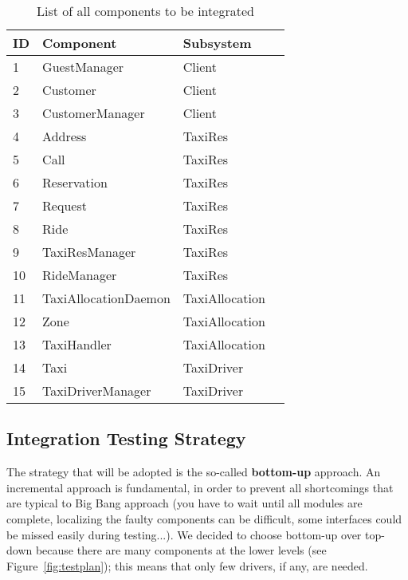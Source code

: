 \documentclass[a4paper, 11pt]{article}
\newcounter{tc}
\begin{document}
\begin{table}
    \centering
    \begin{tabular}{| l | l | p{} | p{} |}
    \hline
    \textbf{ID} & \textbf{Component} & \textbf{Subsystem} \\
    \hline
    1 & GuestManager & Client\\
    \hline
    2 & Customer & Client\\
    \hline
    3 & CustomerManager & Client\\
    \hline
    4 & Address & TaxiRes\\
    \hline
    5 & Call & TaxiRes\\
    \hline
    6 & Reservation & TaxiRes\\
    \hline
    7 & Request & TaxiRes\\
    \hline
    8 & Ride & TaxiRes\\
    \hline
    9 & TaxiResManager & TaxiRes\\
    \hline
    10 & RideManager & TaxiRes\\
    \hline
    11 & TaxiAllocationDaemon & TaxiAllocation\\
    \hline
    12 & Zone & TaxiAllocation\\
    \hline
    13 & TaxiHandler & TaxiAllocation\\
    \hline
    14 & Taxi & TaxiDriver\\
    \hline
    15 & TaxiDriverManager & TaxiDriver\\
    \hline
    \end{tabular}
    \caption{List of all components to be integrated}
    \label{tab:components-integration}
\end{table}

\subsection{Integration Testing Strategy} 
\label{sub:integration_testing_strategy}
The strategy that will be adopted is the so-called \textbf{bottom-up} approach. An incremental approach is fundamental, in order to prevent all shortcomings that are typical to Big Bang approach (you have to wait until all modules are complete, localizing the faulty components can be difficult, some interfaces could be missed easily during testing...).
We decided to choose bottom-up over top-down because there are many components at the lower levels (see Figure~\ref{fig:testplan}); this means that only few drivers, if any, are needed.
\end{document}
